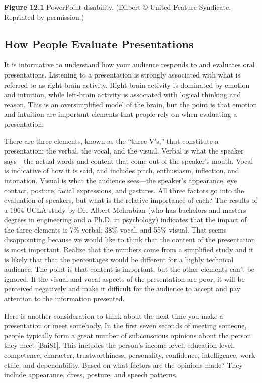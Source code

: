 \textbf{Figure 12.1} PowerPoint disability. (Dilbert © United Feature
Syndicate. Reprinted by permission.)

\subsection{How People Evaluate
Presentations}\label{how-people-evaluate-presentations}

It is informative to understand how your audience responds to and
evaluates oral presentations. Listening to a presentation is strongly
associated with what is referred to as right-brain activity. Right-brain
activity is dominated by emotion and intuition, while left-brain
activity is associated with logical thinking and reason. This is an
oversimplified model of the brain, but the point is that emotion and
intuition are important elements that people rely on when evaluating a
presentation.

There are three elements, known as the ``three V's,'' that constitute a
presentation: the verbal, the vocal, and the visual. Verbal is what the
speaker says---the actual words and content that come out of the
speaker's mouth. Vocal is indicative of how it is said, and includes
pitch, enthusiasm, inflection, and intonation. Visual is what the
audience sees---the speaker's appearance, eye contact, posture, facial
expressions, and gestures. All three factors go into the evaluation of
speakers, but what is the relative importance of each? The results of a
1964 UCLA study by Dr. Albert Mehrabian (who has bachelors and masters
degrees in engineering and a Ph.D. in psychology) indicates that the
impact of the three elements is 7\% verbal, 38\% vocal, and 55\% visual.
That seems disappointing because we would like to think that the content
of the presentation is most important. Realize that the numbers come
from a simplified study and it is likely that that the percentages would
be different for a highly technical audience. The point is that content
is important, but the other elements can't be ignored. If the visual and
vocal aspects of the presentation are poor, it will be perceived
negatively and make it difficult for the audience to accept and pay
attention to the information presented.

Here is another consideration to think about the next time you make a
presentation or meet somebody. In the first seven seconds of meeting
someone, people typically form a great number of subconscious opinions
about the person they meet {[}Bai81{]}. This includes the person's
income level, education level, competence, character, trustworthiness,
personality, confidence, intelligence, work ethic, and dependability.
Based on what factors are the opinions made? They include appearance,
dress, posture, and speech patterns.

